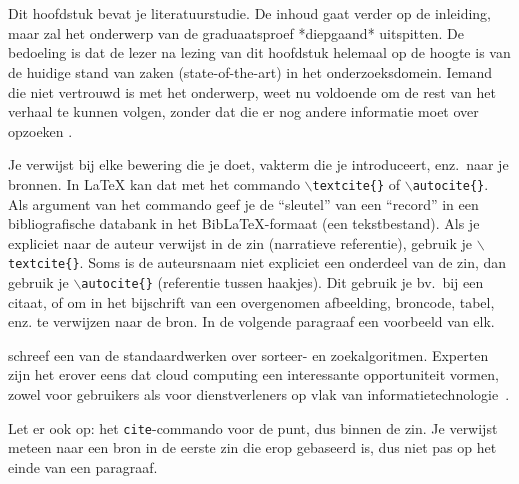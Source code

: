 \chapter{}%
\label{ch:stand-van-zaken}



Dit hoofdstuk bevat je literatuurstudie. De inhoud gaat verder op de inleiding, maar zal het onderwerp van de graduaatsproef *diepgaand* uitspitten. De bedoeling is dat de lezer na lezing van dit hoofdstuk helemaal op de hoogte is van de huidige stand van zaken (state-of-the-art) in het onderzoeksdomein. Iemand die niet vertrouwd is met het onderwerp, weet nu voldoende om de rest van het verhaal te kunnen volgen, zonder dat die er nog andere informatie moet over opzoeken \autocite{Pollefliet2011}.

Je verwijst bij elke bewering die je doet, vakterm die je introduceert, enz.\ naar je bronnen. In \LaTeX{} kan dat met het commando \texttt{$\backslash${textcite\{\}}} of \texttt{$\backslash${autocite\{\}}}. Als argument van het commando geef je de ``sleutel'' van een ``record'' in een bibliografische databank in het Bib\LaTeX{}-formaat (een tekstbestand). Als je expliciet naar de auteur verwijst in de zin (narratieve referentie), gebruik je \texttt{$\backslash${}textcite\{\}}. Soms is de auteursnaam niet expliciet een onderdeel van de zin, dan gebruik je \texttt{$\backslash${}autocite\{\}} (referentie tussen haakjes). Dit gebruik je bv.~bij een citaat, of om in het bijschrift van een overgenomen afbeelding, broncode, tabel, enz. te verwijzen naar de bron. In de volgende paragraaf een voorbeeld van elk.

\textcite{Knuth1998} schreef een van de standaardwerken over sorteer- en zoekalgoritmen. Experten zijn het erover eens dat cloud computing een interessante opportuniteit vormen, zowel voor gebruikers als voor dienstverleners op vlak van informatietechnologie~\autocite{Creeger2009}.

Let er ook op: het \texttt{cite}-commando voor de punt, dus binnen de zin. Je verwijst meteen naar een bron in de eerste zin die erop gebaseerd is, dus niet pas op het einde van een paragraaf.

